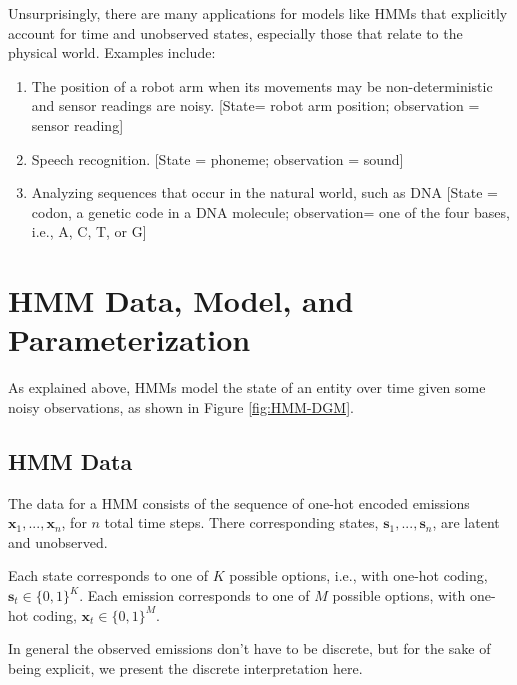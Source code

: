 Unsurprisingly, there are many applications for models like HMMs that explicitly account for time and unobserved states, especially those that relate to the physical world. Examples include:
\begin{enumerate}
    \item The position of a robot arm when its movements may be non-deterministic and sensor readings are noisy. [State= robot arm position; observation  = sensor reading]
    \item Speech recognition. [State = phoneme; observation = sound]
    \item Analyzing sequences that occur in the natural world, such as DNA [State = codon, a genetic code in a DNA molecule; observation= one of the four bases, i.e., A, C, T, or G]
\end{enumerate}

\section{HMM Data, Model, and Parameterization}

As explained above, HMMs model the state of an entity over time given some noisy observations, as shown in Figure \ref{fig:HMM-DGM}.

\subsection{HMM Data}

The data for a HMM consists of the sequence of one-hot encoded emissions $\textbf{x}_1, ..., \textbf{x}_n$, for $n$ total time steps. There corresponding states, $\textbf{s}_1, ..., \textbf{s}_n$, are latent and unobserved.

Each state corresponds to one of $K$ possible options, i.e., with one-hot coding,
$\textbf{s}_t \in \{0,1\}^K$. Each emission corresponds to one of $M$ possible options, with one-hot coding, $\textbf{x}_t \in \{0,1\}^M$.

\begin{warning}
    In general the observed emissions don't have to be discrete, but for the sake of being explicit, we present the discrete interpretation here.
\end{warning}


